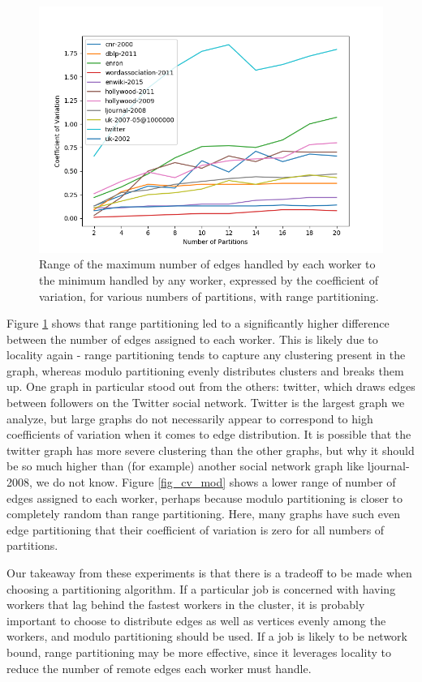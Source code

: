 \begin{figure}[!t]
	\centering
	\includegraphics[width=\columnwidth]{../good_plots/range_as_cv_chunked.png}
	\caption{Range of the maximum number of edges handled by each worker to the 
		minimum handled by any worker, expressed by the coefficient of 
		variation, for various numbers of partitions, with range 
		partitioning.}
	\label{fig:cv_range}
\end{figure}

Figure \ref{fig:cv_range} shows that range partitioning led to a significantly 
higher 
difference between the number of edges assigned to each worker. This is likely 
due to locality again - range partitioning tends to capture any clustering 
present in the graph, whereas modulo partitioning evenly distributes clusters 
and breaks them up. One graph in particular stood out from the others: twitter, 
which draws edges between followers on the Twitter social network. Twitter is 
the largest graph we analyze, but large graphs do not necessarily appear to 
correspond to high coefficients of variation when it comes to edge 
distribution. It is possible that the twitter graph has more severe clustering 
than the other graphs, but why it should be so much higher than (for example) 
another social network graph like ljournal-2008, we do not know. Figure 
\ref{fig_cv_mod} shows a lower range of number of edges assigned to each 
worker, perhaps because modulo partitioning is closer to completely random than 
range partitioning. Here, many graphs have such even edge partitioning that 
their coefficient of variation is zero for all numbers of partitions. 

Our takeaway from these experiments is that there is a tradeoff to be made when 
choosing a partitioning algorithm. If a particular job is concerned with having 
workers that lag behind the fastest workers in the cluster, it is probably 
important to choose to distribute edges as well as vertices evenly among the 
workers, and modulo partitioning should be used. If a job is likely to be 
network bound, range partitioning may be more effective, since it leverages 
locality to reduce the number of remote edges each worker must handle.